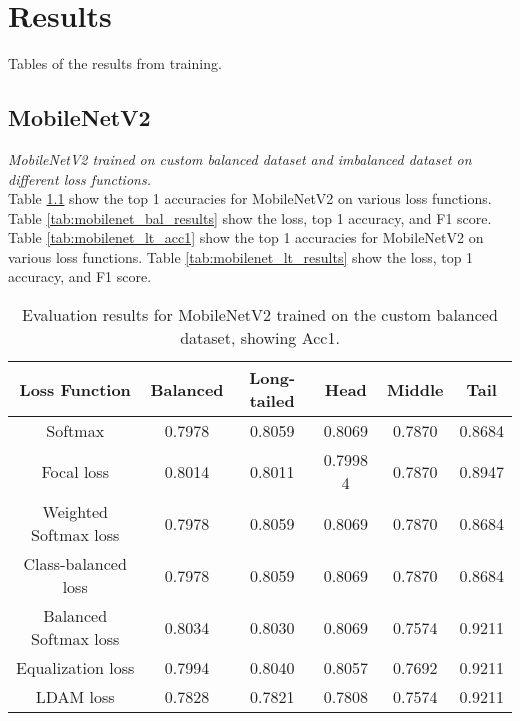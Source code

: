 \chapter{Results} %
\label{app:A}
Tables of the results from training.


\section{MobileNetV2}
\textit{MobileNetV2 trained on custom balanced dataset and imbalanced dataset on different loss functions.}\\

Table \ref{tab:mobilenet_bal_acc1} show the top 1 accuracies for MobileNetV2 on various loss functions. Table \ref{tab:mobilenet_bal_results} show the loss, top 1 accuracy, and F1 score.\\
Table \ref{tab:mobilenet_lt_acc1} show the top 1 accuracies for MobileNetV2 on various loss functions. Table \ref{tab:mobilenet_lt_results} show the loss, top 1 accuracy, and F1 score. 

\begin{table}[H]
    \centering
    \begin{tabular}{cccccc}
        \toprule
        Loss Function & Balanced & Long-tailed & Head & Middle & Tail \\ 
        \midrule
        Softmax   & 0.7978   & 0.8059 & 0.8069 & 0.7870 & 0.8684 \\
        Focal loss   & 0.8014   & 0.8011 & 0.7998 4 & 0.7870 & 0.8947 \\
        Weighted Softmax loss   & 0.7978   & 0.8059 & 0.8069 & 0.7870 & 0.8684 \\
        Class-balanced loss   & 0.7978   & 0.8059 & 0.8069 & 0.7870 & 0.8684 \\
        Balanced Softmax loss   & 0.8034  & 0.8030 & 0.8069 & 0.7574 & 0.9211 \\
        Equalization loss   & 0.7994   & 0.8040 & 0.8057 & 0.7692 & 0.9211 \\
        LDAM loss   &  0.7828   & 0.7821 & 0.7808 & 0.7574 & 0.9211 \\
        \bottomrule
    \end{tabular}
    \caption{Evaluation results for MobileNetV2 trained on the custom balanced dataset, showing Acc1.}
    \label{tab:mobilenet_bal_acc1}
\end{table}

